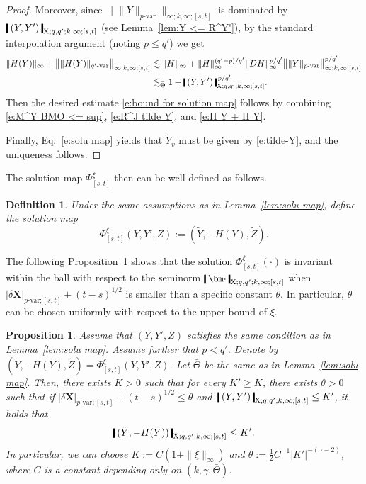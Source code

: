 \documentclass[11pt,reqno]{amsart}
\newtheorem{definition}[lemma]{Definition}
\newtheorem{proposition}[lemma]{Proposition}
\numberwithin{equation}{section}
\newcommand{\shortthickbar}{%
  \vcenter{\hbox{\rule{1.8pt}{2.2ex}}}%
}
\newcommand{\thicknm}[1]{%
  \mathopen{\shortthickbar}%
  \mkern4mu #1 \mkern4mu%
  \mathclose{\shortthickbar}%
}
\begin{document}
\begin{proof}
Moreover, since $\| \|Y\|_{p\text{-}\mathrm{var}} \|_{\infty;k,\infty;[s,t]}$ is dominated by $\thicknm{(Y,Y')}_{\mathrm X;q,q';k,\infty;[s,t]}$ (see Lemma~\ref{lem:Y <= R^Y'}), by the standard interpolation argument (noting $p \le q'$) we get  
\begin{equation}\label{e:H Y + H Y}
\begin{aligned}
\|H(Y)\|_{\infty} + \big\| \|H(Y)\|_{q'\text{-}\mathrm{var}} \big\|_{\infty;k,\infty;[s,t]} &\lesssim \|H\|_{\infty} + \|H\|^{(q'-p)/q'}_{\infty} \|D H\|^{p/q'}_{\infty} \big\| \|Y\|_{p\text{-}\mathrm{var}} \big\|^{p/q'}_{\infty;k,\infty;[s,t]}\\
&\lesssim_{\bar \Theta} 1 + \thicknm{(Y,Y')}^{\,p/q'}_{\mathrm X;q,q';k,\infty;[s,t]}. 
\end{aligned}
\end{equation}
Then the desired estimate \eqref{e:bound for solution map} follows by combining \eqref{e:M^Y BMO <= sup}, \eqref{e:R^J tilde Y}, and \eqref{e:H Y + H Y}. 

Finally, Eq.~\eqref{e:solu map} yields that $\tilde Y_v$ must be given by \eqref{e:tilde-Y}, and the uniqueness follows.
\end{proof}

The solution map $\Phi^{\xi}_{[s,t]}$ then can be well-defined as follows. 

\begin{definition}\label{def:solu map}
Under the same assumptions as in Lemma~\ref{lem:solu map}, define the solution map 
\begin{equation*}
\Phi^{\xi}_{[s,t]}(Y,Y',Z) := (\tilde Y,-H(Y),\tilde Z). 
\end{equation*}
\end{definition}

The following Proposition~\ref{prop:invariant within ball} shows that the solution  $\Phi^{\xi}_{[s,t]}(\bm\cdot)$ is  invariant within the ball with respect to the seminorm $\thicknm{\bm\cdot}_{\mathrm X;q,q';k,\infty;[s,t]}$ when $|\delta \mathbf X|_{p\text{-}\mathrm{var};[s,t]} + (t-s)^{1/2}$ is smaller than a specific constant $\theta$. In particular, $\theta$ can be chosen uniformly with respect to the upper bound of $\xi$.


\begin{proposition}\label{prop:invariant within ball}
Assume that $(Y,Y',Z)$ satisfies the same condition as in Lemma~\ref{lem:solu map}. Assume further that $p < q'$. Denote by $(\tilde Y,-H(Y),\tilde Z) = \Phi^{\xi}_{[s,t]}(Y,Y',Z)$. Let $\bar \Theta$ be the same as in Lemma~\ref{lem:solu map}. 
Then, there exists $K > 0$ such that for every $K' \ge K$, there exists $\theta > 0$ such that if $|\delta \mathbf X|_{p\text{-}\mathrm{var};[s,t]} + (t-s)^{1/2} \le \theta$ and $\,\thicknm{(Y,Y')}_{\mathrm X;q,q';k,\infty;[s,t]} \le K'$, it holds that 
\begin{equation}\label{e:<= K'} 
\thicknm{(\tilde Y,-H(Y))}_{\mathrm X;q,q';k,\infty;[s,t]} \le K'.
\end{equation} 
In particular, we can choose $K := C(1 + \|\xi\|_{\infty})$ and $\theta := 
\frac{1}{2} 
C^{-1} | K' |^{-(\gamma - 2)}$, where $C$ is a constant depending only on $(k,\gamma,\bar \Theta)$. 
\end{proposition}
\end{document}

